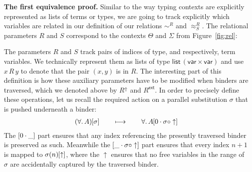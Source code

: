 \documentclass[a4paper,UKenglish]{lipics-v2016}
\newcommand{\ty}{\mathsf{ty}}
\newcommand{\tm}{\mathsf{tm}}
\newcommand{\tyr}{\mathrel{\sim}}
\newcommand{\tmr}{\mathrel{\approx}}
\newcommand{\Rext}[1]{\ensuremath{#1^{\mathsf{ext}}}}
\newcommand{\Rshift}[1]{\ensuremath{#1^{\Uparrow}}}
\newcommand{\Prp}{\ensuremath{\textrm{\textasteriskcentered}}}
\newcommand{\All}{\ensuremath{\forall.\,}}
\newcommand{\Lam}[1]{\ensuremath{\lambda #1.\,}}
\newcommand{\TyLam}{\ensuremath{\Lambda.\,}}
\newcommand{\Prod}[1]{\ensuremath{\Pi #1.\,}}
\newcommand{\subst}[1]{\hphantom{|}\!\![{#1}]}
\newcommand{\scons}{\mathbin{\cdot}}
\newcommand{\scomp}{\mathbin{\circ}}
\newcommand{\shift}{\ensuremath{\uparrow}}
\theoremstyle{plain}
\begin{document}
{\bf The first equivalence proof.}
Similar to the way typing contexts are explicitly represented as lists of terms or types, we are going to track explicitly which variables are related in our definition of our relations $\tyr^R$ and $\tmr^R_S$.
The relational parameters $R$ and $S$ correspond to the contexts $\Theta$ and $\Sigma$ from Figure~\ref{fig:rel}:

\vspace{-.5em}
{\small
{}
}\vspace{-1em}

The parameters $R$ and $S$ track pairs of indices of type, and respectively, term variables.
We technically represent them as lists of type $\mathsf{list}\,(\mathsf{var} \times \mathsf{var})$ and use $x\,R\,y$ to denote that the pair $(x,y)$ is in $R$.
The interesting part of this definition is how these auxiliary parameters have to be modified when binders are traversed, which we denoted above by $\Rshift{R}$ and $\Rext{R}$.
In order to precisely define these operations, let us recall the required action on a parallel substitution $\sigma$ that is pushed underneath a binder:
\begin{align*}
  (\All A)\subst{\sigma} \qquad\longmapsto\qquad \All A\subst{0 \scons \sigma \scomp \shift}
\end{align*}
The $\subst{0 \scons \_}$ part ensures that any index referencing the presently traversed binder is preserved as such.
Meanwhile the $\subst{\_ \scons \sigma \scomp \shift}$ part ensures that every index $n + 1$ is mapped to $\sigma(n)\subst{\shift}$, where the $\shift$ ensures that no free variables in the range of $\sigma$ are accidentally captured by the traversed binder.
\end{document}
